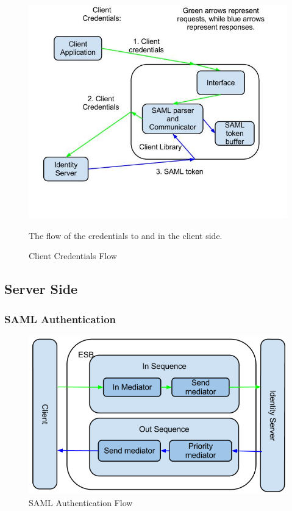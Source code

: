 \documentclass[12pt]{article}
\begin{document}
        \begin{figure}[htb]
            \centering
            \includegraphics[scale=0.5]{client_credentials_flow}
            \caption{Client Credentials Flow}
            The flow of the credentials to and in the client side.
            \label{fig:clientcredentials}
        \end{figure}
        
    \subsection{Server Side}\label{serverdesign}
        \subsubsection{SAML Authentication}\label{samlauth}
            \begin{figure}[htb]
                \centering
                \includegraphics[scale=0.5]{SAMLauthenticationflow}
                \caption{SAML Authentication Flow}
                \label{fig:SAMLflow}
            \end{figure}
\end{document}
